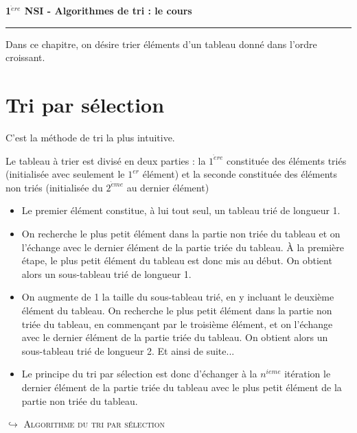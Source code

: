 \documentclass[a4paper,french]{article}
\newcommand{\Titre}[1]{\textbf{{\large{#1}}}}
\begin{document}
\pagestyle{empty}
\parindent 0mm

\begin{center}
\Titre{1$^{\grave{e}re}$ NSI  -  Algorithmes de tri : le cours}
\\[5mm]
\end{center}
\hrule
\vspace*{5mm}

Dans ce chapitre, on désire trier éléments d'un tableau donné dans l'ordre croissant. 

\bigskip

\section{Tri par sélection}

C'est la méthode de tri la plus intuitive. 

Le tableau à trier est \og divisé \fg en deux parties : la $1^{\grave{e}re}$ constituée des éléments triés (initialisée avec seulement le $1^{er}$ élément) et la seconde constituée des éléments non triés (initialisée du $2^{\grave{e}me}$ au dernier élément)
\medskip

\begin{itemize}
\item Le premier élément constitue, à lui tout seul, un tableau trié de longueur 1.

\item On recherche le plus petit élément dans la partie non triée du tableau et on l'échange avec le dernier élément de la partie triée du tableau. À la première étape, le plus petit élément du tableau est donc mis au début. On obtient alors un sous-tableau trié de longueur 1.  

\item On augmente de 1 la taille du sous-tableau trié, en y incluant le deuxième élément du tableau. On recherche le plus petit élément dans la partie non triée du tableau, en commençant par le troisième élément, et on l'échange avec le dernier élément de la partie triée du tableau. On obtient alors un sous-tableau trié de longueur 2. Et ainsi de suite...

\item Le principe du tri par sélection est donc d'échanger à la $n^{ieme}$ itération le dernier élément de la partie  triée du tableau avec le plus petit élément de la partie  non triée du tableau.
\end{itemize}
\medskip

$\hookrightarrow$ \textsc{Algorithme du tri par sélection}
\medskip
\end{document}
